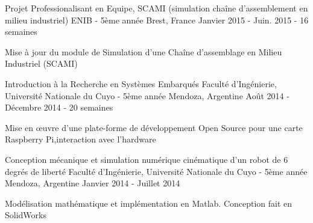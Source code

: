 

\begin{cventries}
\cventry
{Projet Professionalisant en Equipe, SCAMI (simulation chaîne d'assemblement en milieu industriel)} %
{ENIB - 5ème année} %
{Brest, France} %
{Janvier 2015 - Juin. 2015 - 16 semaines} %
{
	\begin{cvitems} %
		\item {Mise à jour du module de Simulation d'une Chaîne d'assemblage en Milieu Industriel (SCAMI)}
	\end{cvitems}
}
  \cventry
    {Introduction à la Recherche en Systèmes Embarqués} %
    {Faculté d'Ingénierie, Université Nationale du Cuyo - 5ème année} %
    {Mendoza, Argentine} %
    {Août 2014 - Décembre 2014 - 20 semaines} %
    {
      \begin{cvitems} %
        \item {Mise en \oe{uvre} d'une plate-forme de développement Open Source pour une carte Raspberry Pi,interaction avec l'hardware }
      \end{cvitems}
    }
\cventry
{Conception mécanique et simulation numérique cinématique d'un robot de 6 degrés de liberté} %
{Faculté d'Ingénierie, Université Nationale du Cuyo - 5ème année} %
{Mendoza, Argentine} %
{Janvier 2014 - Juillet 2014} %
{
	\begin{cvitems} %
	\item {Modélisation mathématique et implémentation en Matlab. Conception fait en SolidWorks}
	\end{cvitems}
}



\end{cventries}

